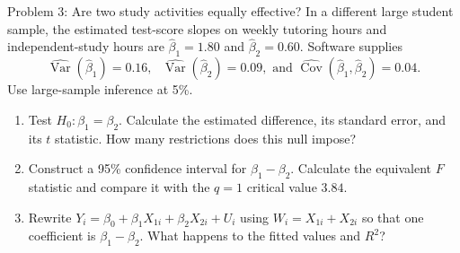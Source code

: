 \documentclass[notes,10pt, aspectratio=169]{beamer}
\newif\ifshowsolutions
\newcommand{\Var}{\operatorname{Var}}
\newcommand{\Cov}{\operatorname{Cov}}
\newcommand{\answerpart}[1]{\textcolor{blue}{\textbf{#1.}}\,}
\begin{document}
\ifshowsolutions
\begin{frame}{Solution 2: The covariance changes the joint test}
\small
\answerpart{1}Standard errors are square roots of the diagonal entries:
\[
SE(\hat\beta_1)=SE(\hat\beta_2)=1,\text{ and }\hat\rho=\frac{-0.50}{1\cdot1}=-0.50.
\]
Thus $t_1=t_2=1.50$. Neither separate test rejects at 5\%.
\par\smallskip
\answerpart{2}The joint null is $H_0:\beta_1=\beta_2=0$; the alternative is that at least one coefficient is nonzero. There are $q=2$ restrictions.
\[
F=\frac{2.25+2.25-2(-0.50)(1.50)(1.50)}{2(1-0.25)}
=\frac{6.75}{1.50}=\boxed{4.50}.
\]
\answerpart{3}Reject the joint null, because $4.50>3.00$. The coefficient estimates move together in a direction that is relatively unusual given their negative estimated correlation.
\par\smallskip
The average $(t_1^2+t_2^2)/2=2.25$ ignores covariance. It equals the joint statistic only when $\hat\rho=0$.
\end{frame}
\fi

\begin{frame}{Problem 3: Are two study activities equally effective?}
\small
In a different large student sample, the estimated test-score slopes on weekly tutoring hours and independent-study hours are $\hat\beta_1=1.80$ and $\hat\beta_2=0.60$. Software supplies
\[
\widehat{\Var}(\hat\beta_1)=0.16,\text{ }\widehat{\Var}(\hat\beta_2)=0.09,
\text{ and }\widehat{\Cov}(\hat\beta_1,\hat\beta_2)=0.04.
\]
Use large-sample inference at 5\%.
\begin{enumerate}
\item Test $H_0:\beta_1=\beta_2$. Calculate the estimated difference, its standard error, and its $t$ statistic. How many restrictions does this null impose?
\item Construct a 95\% confidence interval for $\beta_1-\beta_2$. Calculate the equivalent $F$ statistic and compare it with the $q=1$ critical value $3.84$.
\item Rewrite $Y_i=\beta_0+\beta_1X_{1i}+\beta_2X_{2i}+U_i$ using $W_i=X_{1i}+X_{2i}$ so that one coefficient is $\beta_1-\beta_2$. What happens to the fitted values and $R^2$?
\end{enumerate}
\end{frame}

\ifshowsolutions
\begin{frame}{Solution 3: One restriction on two coefficients}
\small
\answerpart{1}Let $\delta=\beta_1-\beta_2$. Then $\hat\delta=1.20$ and
\[
SE(\hat\delta)=\sqrt{0.16+0.09-2(0.04)}=\sqrt{0.17}=0.4123.
\]
\[
t=\frac{1.20}{\sqrt{0.17}}=2.9104.
\]
There is one restriction, $\delta=0$. Reject equality at 5\%.
\par\smallskip
\answerpart{2}The 95\% interval is
\[
1.20\pm1.96\sqrt{0.17}=[0.3919,2.0081].
\]
It excludes zero. The equivalent statistic is $F=t^2=8.4706>3.84$, giving the same decision.
\par\smallskip
\answerpart{3}The equivalent regression is
\[
Y_i=\beta_0+(\beta_1-\beta_2)X_{1i}+\beta_2W_i+U_i.
\]
Test the coefficient on $X_1$ against zero. The regressors are rearranged without changing the fitted values, residuals, or $R^2$.
\end{frame}
\fi
\end{document}
